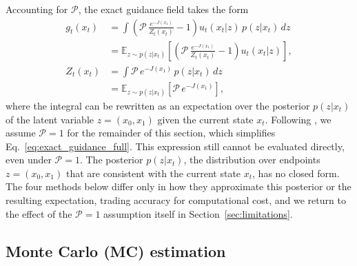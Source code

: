 \documentclass{article}
\begin{document}
Accounting for $\mathcal{P}$, the exact guidance field takes the form
\begin{equation}
    \begin{split}
        g_t(x_t) &= \int \left(\mathcal{P}\,\frac{e^{-J(x_1)}}{Z_t(x_t)} - 1\right) u_t(x_t|z)\, p(z|x_t)\, dz \\
        &= \mathbb{E}_{z \sim p(z|x_t)}\left[\left(\mathcal{P}\,\frac{e^{-J(x_1)}}{Z_t(x_t)} - 1\right) u_t(x_t|z)\right], \\[6pt]
        Z_t(x_t) &= \int \mathcal{P}\, e^{-J(x_1)}\, p(z|x_t)\, dz \\
        &= \mathbb{E}_{z \sim p(z|x_t)}\left[\mathcal{P}\, e^{-J(x_1)}\right],
    \end{split}
    \label{eq:exact_guidance_full}
\end{equation}
where the integral can be rewritten as an expectation over the posterior $p(z|x_t)$ of the latent variable $z=(x_0,x_1)$ given the current state $x_t$.
Following \citet{feng25s_guidance}, we assume $\mathcal{P} = 1$ for the remainder of this section, which simplifies Eq.~\eqref{eq:exact_guidance_full}.
This expression still cannot be evaluated directly, even under $\mathcal{P} = 1$.
The posterior $p(z|x_t)$, the distribution over endpoints $z=(x_0,x_1)$ that are consistent with the current state $x_t$, has no closed form.
The four methods below differ only in how they approximate this posterior or the resulting expectation, trading accuracy for computational cost, and we return to the effect of the $\mathcal{P} = 1$ assumption itself in Section~\ref{sec:limitations}.

\subsection{Monte Carlo (MC) estimation}
\end{document}
